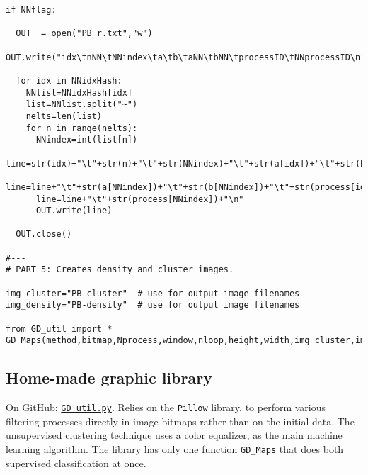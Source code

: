 \documentclass[oneside,10pt]{book}
\begin{document}
\begin{lstlisting}
if NNflag:

  OUT  = open("PB_r.txt","w")     
  OUT.write("idx\tnNN\tNNindex\ta\tb\taNN\tbNN\tprocessID\tNNprocessID\n")

  for idx in NNidxHash:
    NNlist=NNidxHash[idx]
    list=NNlist.split("~")
    nelts=len(list)
    for n in range(nelts): 
      NNindex=int(list[n])
      line=str(idx)+"\t"+str(n)+"\t"+str(NNindex)+"\t"+str(a[idx])+"\t"+str(b[idx])
      line=line+"\t"+str(a[NNindex])+"\t"+str(b[NNindex])+"\t"+str(process[idx])
      line=line+"\t"+str(process[NNindex])+"\n"
      OUT.write(line)  
                
  OUT.close()

#---
# PART 5: Creates density and cluster images.

img_cluster="PB-cluster"  # use for output image filenames
img_density="PB-density"  # use for output image filenames

from GD_util import *
GD_Maps(method,bitmap,Nprocess,window,nloop,height,width,img_cluster,img_density)
\end{lstlisting}

\subsection{Home-made graphic library}\label{fc223}

On GitHub: \href{https://github.com/VincentGranville/Point-Processes/blob/main/Source\%20Code/GD_util.py}{\texttt{GD\_util.py}}. Relies
on the \texttt{Pillow} library, to perform various filtering processes directly in image bitmaps rather than on the initial data. The unsupervised clustering technique uses a color equalizer, as the main machine learning algorithm. The library has only
one function \texttt{GD\_Maps}  that does both supervised classification at once. 
\end{document}
